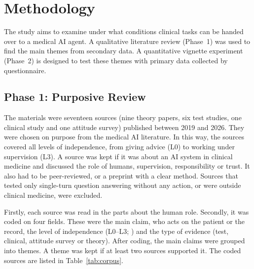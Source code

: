 \section{Methodology}
\label{sec:method}

The study aims to examine under what conditions clinical tasks can be handed over to a medical AI agent. A qualitative literature review (Phase~1) was used to find the main themes from secondary data. A quantitative vignette experiment (Phase~2) is designed to test these themes with primary data collected by questionnaire.

\subsection{Phase 1: Purposive Review}
\label{sec:review}

The materials were seventeen sources (nine theory papers, six test studies, one clinical study and one attitude survey) published between 2019 and 2026. They were chosen on purpose from the medical AI literature. In this way, the sources covered all levels of independence, from giving advice (L0) to working under supervision (L3). A source was kept if it was about an AI system in clinical medicine and discussed the role of humans, supervision, responsibility or trust. It also had to be peer-reviewed, or a preprint with a clear method. Sources that tested only single-turn question answering without any action, or were outside clinical medicine, were excluded.

Firstly, each source was read in the parts about the human role. Secondly, it was coded on four fields. These were the main claim, who acts on the patient or the record, the level of independence (L0--L3; \citealp{ye2025autonomy}) and the type of evidence (test, clinical, attitude survey or theory). After coding, the main claims were grouped into themes. A theme was kept if at least two sources supported it. The coded sources are listed in Table~\ref{tab:corpus}.

